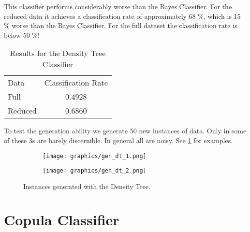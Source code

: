 \documentclass[draft]{article}
\begin{document}
This classifier performs considerably worse than the Bayes Classifier. For the reduced data it achieves a 
classification rate of approximately 68 \%, which is 15 \% worse than the Bayes Classifier. 
For the full dataset the classification rate is below 50 \%!

\begin{table}[h]
	\centering
	\begin{tabular}{l c}
		Data	&	Classification Rate	\\
		Full	&	0.4928				\\
	 	Reduced & 	0.6860				\\
	\end{tabular}
	\caption{Results for the Density Tree Classifier}
	\label{tab2}
\end{table}

To test the generation ability we generate 50 new instances of data.
Only in some of these 3s are barely discernible. In general all are noisy.
See \ref{fig2} for examples.

\begin{figure}[h]
	\centering
	\begin{subfigure}[b]{0.4\textwidth}
		\texttt{[image: graphics/gen\_dt\_1.png]}
	\end{subfigure}
	\begin{subfigure}[b]{0.4\textwidth}
		\texttt{[image: graphics/gen\_dt\_2.png]}
	\end{subfigure}
	\caption{Instances generated with the Density Tree.}
	\label{fig2}
\end{figure}

\section{Copula Classifier}
\end{document}
